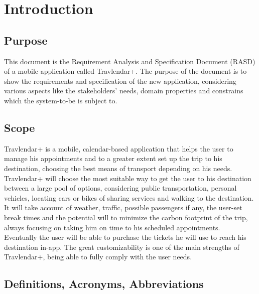 %
%
\chapter{Introduction}
%
\label{cap:introduction}
%
%
\section{Purpose}
This document is the Requirement Analysis and Specification Document (RASD) of a mobile application called Travlendar+. The purpose of the document is to show the requirements and specification of the new application, considering various aspects like the stakeholders' needs, domain properties and constrains which the system-to-be is subject to.
%
%
\section{Scope}
Travlendar+ is a mobile, calendar-based application that helps the user to manage his appointments and to a greater extent set up the trip to his destination, choosing the best means of transport depending on his needs. \\
Travlendar+ will choose the most suitable way to get the user to his destination between a large pool of options, considering public transportation, personal vehicles, locating cars or bikes of sharing services and walking to the destination. It will take account of weather, traffic, possible passengers if any, the user-set break times and the potential will to minimize the carbon footprint of the trip, always focusing on taking him on time to his scheduled appointments. \\
Eventually the user will be able to purchase the tickets he will use to reach his destination in-app. The great customizability is one of the main strengths of Travlendar+, being able to fully comply with the user needs. 
%
%
\section{Definitions, Acronyms, Abbreviations}
%
